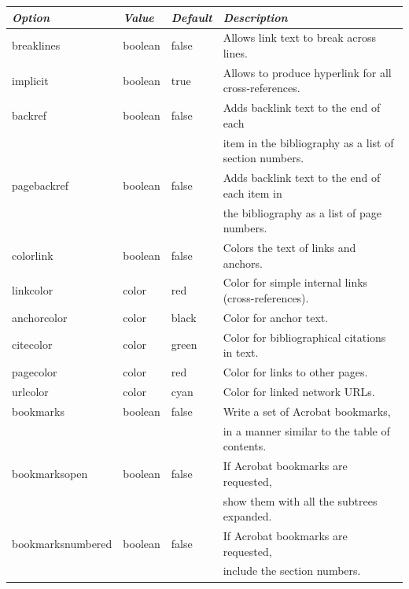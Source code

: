 \documentclass[landscape, headrule, footrule]{foils}
\begin{document}
{\small
\begin{tabular}{llll}
\hline
\textit{Option}&\textit{Value}&\textit{Default}&\textit{Description}\\
\hline
breaklines& boolean& false & Allows link text to break across lines.\\
implicit & boolean& true & Allows to produce hyperlink for all cross-references.\\
\hline
backref & boolean&false & Adds backlink text to the end of each\\
        &        &      & item in the bibliography as a
list of section numbers.\\
pagebackref&boolean&false&Adds backlink text to the end of each item in \\
           &       &      &the bibliography as a
list of page numbers.\\
colorlink&boolean&false&Colors the text of links and anchors.\\
linkcolor&color&red&Color for simple internal links (cross-references).\\
anchorcolor&color&black&Color for anchor text.\\
citecolor&color&green&Color for bibliographical citations in text.\\
pagecolor&color&red&Color for links to other pages.\\
urlcolor&color&cyan&Color for linked network URLs.\\
\hline
bookmarks&boolean&false&Write a set of Acrobat bookmarks, \\
         &       &     &in a manner similar to the table of contents.\\
{\tiny bookmarksopen}&boolean&false&If Acrobat bookmarks are requested,\\
             &       &     & show them with all the subtrees expanded.\\
{\tiny bookmarksnumbered}&boolean&false&If Acrobat bookmarks are requested,\\
             &       &     & include the section numbers.\\
\hline
\end{tabular}
}
\end{document}

